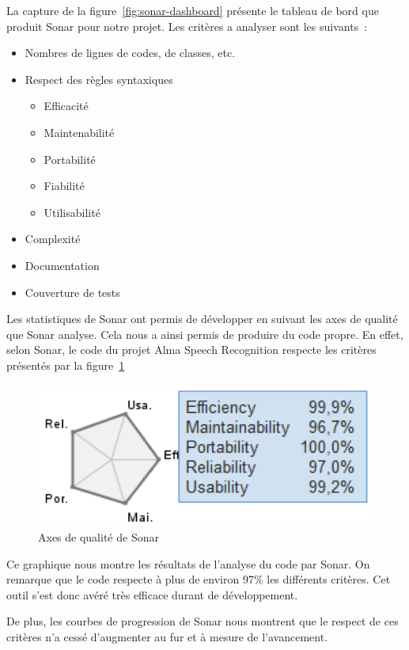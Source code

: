 La capture de la figure~\ref{fig:sonar-dashboard} présente le tableau de bord que produit Sonar pour notre projet. Les critères a analyser sont les suivants~:

\begin{itemize}
\item Nombres de lignes de codes, de classes, etc.
\item Respect des règles syntaxiques
	\begin{itemize}
	\item Efficacité
	\item Maintenabilité
	\item Portabilité
	\item Fiabilité
	\item Utilisabilité
	\end{itemize}
\item Complexité
\item Documentation
\item Couverture de tests
\end{itemize}


Les statistiques de Sonar ont permis de développer en suivant les axes de qualité que Sonar analyse. Cela nous a ainsi permis de produire du code propre. En effet, selon Sonar, le code du projet Alma Speech Recognition respecte les critères présentés par la figure~\ref{fig:sonar-axes}

\begin{figure}[!h]
 \centering
 \includegraphics[scale=1]{images/sonar-axes.png} 
 \caption{Axes de qualité de Sonar}
 \label{fig:sonar-axes}
\end{figure}

Ce graphique nous montre les résultats de l'analyse du code par Sonar. On remarque que le code respecte à plus de environ 97\% les différents critères. Cet outil s'est donc avéré très efficace durant de développement.

De plus, les courbes de progression de Sonar nous montrent que le respect de ces critères n'a cessé d'augmenter au fur et à mesure de l'avancement.




